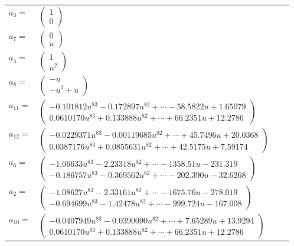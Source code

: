 \documentclass[1p]{elsarticle_modified}
\theoremstyle{definition}
\begin{document}
\begin{tabular}{m{7pt} m{180pt} m{7pt} m{180pt} }
\flushright $a_{3}=$&$\begin{pmatrix}1\\0\end{pmatrix}$ \\
\flushright $a_{7}=$&$\begin{pmatrix}0\\u\end{pmatrix}$ \\
\flushright $a_{4}=$&$\begin{pmatrix}1\\u^2\end{pmatrix}$ \\
\flushright $a_{8}=$&$\begin{pmatrix}- u\\- u^3+u\end{pmatrix}$ \\
\flushright $a_{11}=$&$\begin{pmatrix}-0.101812 u^{83}-0.172897 u^{82}+\cdots-58.5822 u+1.65079\\0.0610170 u^{83}+0.133888 u^{82}+\cdots+66.2351 u+12.2786\end{pmatrix}$ \\
\flushright $a_{12}=$&$\begin{pmatrix}-0.0229371 u^{83}-0.00119685 u^{82}+\cdots+45.7496 u+20.0368\\0.0387176 u^{83}+0.0855631 u^{82}+\cdots+42.5175 u+7.59174\end{pmatrix}$ \\
\flushright $a_{6}=$&$\begin{pmatrix}-1.06633 u^{83}-2.23318 u^{82}+\cdots-1358.51 u-231.319\\-0.186757 u^{83}-0.369562 u^{82}+\cdots-202.390 u-32.6268\end{pmatrix}$ \\
\flushright $a_{2}=$&$\begin{pmatrix}-1.08627 u^{83}-2.33161 u^{82}+\cdots-1675.76 u-278.019\\-0.694699 u^{83}-1.42478 u^{82}+\cdots-999.724 u-167.008\end{pmatrix}$ \\
\flushright $a_{10}=$&$\begin{pmatrix}-0.0407949 u^{83}-0.0390090 u^{82}+\cdots+7.65289 u+13.9294\\0.0610170 u^{83}+0.133888 u^{82}+\cdots+66.2351 u+12.2786\end{pmatrix}$ \\

\end{tabular}
\end{document}
